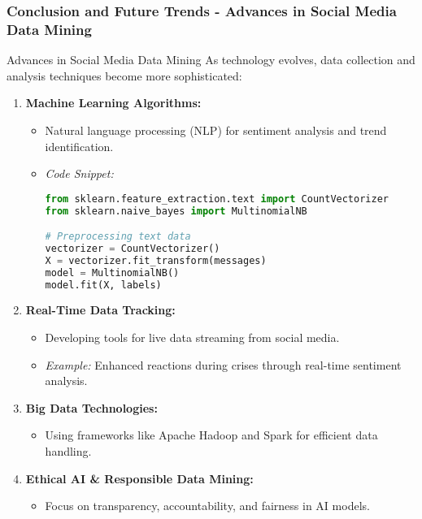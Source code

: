 \documentclass{beamer}
\begin{document}
\begin{frame}[fragile]
    \frametitle{Conclusion and Future Trends - Advances in Social Media Data Mining}
    \begin{block}{Advances in Social Media Data Mining}
        As technology evolves, data collection and analysis techniques become more sophisticated:
        \begin{enumerate}
            \item \textbf{Machine Learning Algorithms:}
                \begin{itemize}
                    \item Natural language processing (NLP) for sentiment analysis and trend identification.
                    \item \textit{Code Snippet:}
                    \begin{lstlisting}[language=Python]
from sklearn.feature_extraction.text import CountVectorizer
from sklearn.naive_bayes import MultinomialNB

# Preprocessing text data
vectorizer = CountVectorizer()
X = vectorizer.fit_transform(messages)  
model = MultinomialNB()
model.fit(X, labels)  
                    \end{lstlisting}
                \end{itemize}
            \item \textbf{Real-Time Data Tracking:} 
                \begin{itemize}
                    \item Developing tools for live data streaming from social media.
                    \item \textit{Example:} Enhanced reactions during crises through real-time sentiment analysis.
                \end{itemize}
            \item \textbf{Big Data Technologies:}
                \begin{itemize}
                    \item Using frameworks like Apache Hadoop and Spark for efficient data handling.
                \end{itemize}
            \item \textbf{Ethical AI & Responsible Data Mining:} 
                \begin{itemize}
                    \item Focus on transparency, accountability, and fairness in AI models.
                \end{itemize}
        \end{enumerate}
    \end{block}
\end{frame}
\end{document}
